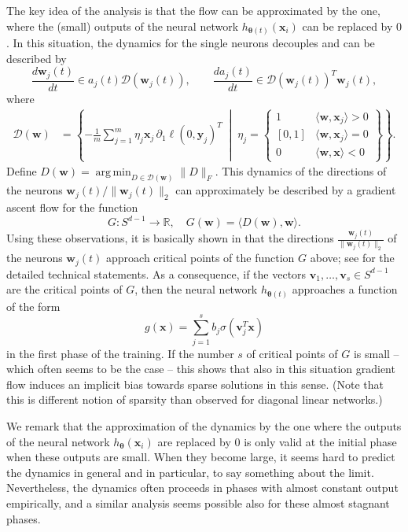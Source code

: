 \documentclass{svproc}
\newcommand{\corr}[1]{#1}
\newcommand{\bv}{\boldsymbol{v}}
\newcommand{\bw}{\boldsymbol{w}}
\newcommand{\bx}{\boldsymbol{x}}
\newcommand{\by}{\boldsymbol{y}}
\newcommand{\btheta}{{\boldsymbol{\theta}}}
\newcommand{\0}{\boldsymbol{0}}
\newcommand{\1}{\boldsymbol{1}}
\DeclareMathOperator*{\argmin}{arg\,min}
\def\R{\mathbb{R}}
\begin{document}
The key idea of the analysis is that the flow can be approximated by the one, where the (small) outputs of the neural network $h_{\btheta(t)}(\bx_i)$ can be replaced by $0$. In this situation, the dynamics for the single neurons decouples and can be described by
\[
\frac{d \bw_j(t)}{dt} \in a_j(t) \mathcal{D}(\bw_j(t)),  \qquad \frac{d a_j(t)}{dt} \in \mathcal{D}(\bw_j(t))^T \bw_j(t), 
\]
where
\begin{align*}
\mathcal{D}(\bw) & = \left\{
-\frac{1}{m} \sum_{j=1}^m \eta_j \bx_j \, \partial_1 \ell(0, \by_j)^T 
\;\middle|\;
\eta_j =\left\{
\begin{array}{ll}
1 & \langle \bw, \bx_j \rangle > 0 \\
{[0,1]} & \langle \bw, \bx_j \rangle = 0 \\
0 & \langle \bw, \bx \rangle < 0
\end{array}\right\}
\right\}.
\end{align*}
Define $D(\bw) = \argmin_{D \in \mathcal{D}(\bw)} \|D\|_F$. This dynamics of the directions of the neurons $\bw_j(t)/\|\bw_j(t)\|_2$ can approximately be described by a gradient ascent flow for the function
\[
G : S^{d-1} \to \R, \quad G(\bw) = \langle D(\bw), \bw \rangle.
\]
Using these observations, it is basically shown in \cite{boursier2025early,maennel2018quantizes} that the directions $\frac{\bw_{j}(t)}{\|\bw_j(t)\|_2}$ of the neurons $\bw_{j}(t)$
approach critical points of the function $G$ above\corr{;} see \cite{boursier2025early,maennel2018quantizes} for the \corr{detailed technical} statements.
As a consequence, if the vectors $\bv_{1},\hdots,\bv_{s} \in S^{d-1}$ are the critical points of $G$, then the neural network $h_{\btheta(t)}$ approaches a function of the form
\[
g(\bx) = \sum_{j=1}^s b_j \sigma(\bv_j^T \bx)
\]
in the first phase of the training. If the number $s$ of critical points of $G$ is small -- which often seems to be the case -- this shows that also in this situation gradient flow induces an implicit bias towards sparse solutions in this sense. (Note that this is different notion of sparsity than observed for diagonal linear networks.)

We remark that the approximation of the dynamics by the one where the outputs of the neural network $h_{\btheta}(\bx_i)$ are replaced by $0$ is only valid at the initial phase when these outputs are small. When they become large, it seems hard to predict the dynamics in general and in particular, to say something about the limit. Nevertheless, the dynamics often proceeds in phases with almost constant output empirically, and a similar analysis seems possible also for these almost stagnant phases.
\end{document}
